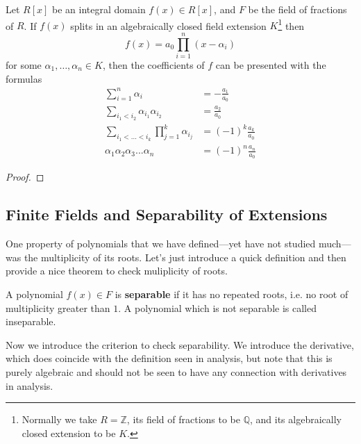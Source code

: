   \begin{theorem}
    Let $R[x]$ be an integral domain $f(x) \in R[x]$, and $F$ be the field of fractions of $R$. If $f(x)$ splits in an algebraically closed field extension $K$\footnote{Normally we take $R = \mathbb{Z}$, its field of fractions to be $\mathbb{Q}$, and its algebraically closed extension to be $K$.} then
    \begin{equation}
      f(x) = a_0 \prod_{i = 1}^{n} (x - \alpha_i)
    \end{equation}
    for some $\alpha_1, \ldots, \alpha_n \in K$, then the coefficients of $f$ can be presented with the formulas
    \begin{align}
      \sum_{i=1}^n \alpha_i & = - \frac{a_1}{a_0} \\
      \sum_{i_1 < i_2} \alpha_{i_1} \alpha_{i_2} & = \frac{a_2}{a_0} \\
      \sum_{i_1< ...< i_k} \prod_{j = 1}^{k} \alpha_{i_j} & = (-1)^k \frac{a_k}{a_0} \\
      \alpha_1 \alpha_2 \alpha_3 ... \alpha_n & = (-1)^n \frac{a_n}{a_0}
    \end{align}
  \end{theorem}
  \begin{proof}
    
  \end{proof}

\subsection{Finite Fields and Separability of Extensions} 

  One property of polynomials that we have defined---yet have not studied much---was the multiplicity of its roots. Let's just introduce a quick definition and then provide a nice theorem to check muliplicity of roots.  

  \begin{definition}
    A polynomial $f(x) \in F$ is \textbf{separable} if it has no repeated roots, i.e. no root of multiplicity greater than $1$. A polynomial which is not separable is called inseparable. 
  \end{definition}

  Now we introduce the criterion to check separability. We introduce the derivative, which does coincide with the definition seen in analysis, but note that this is purely algebraic and should not be seen to have any connection with derivatives in analysis.  

